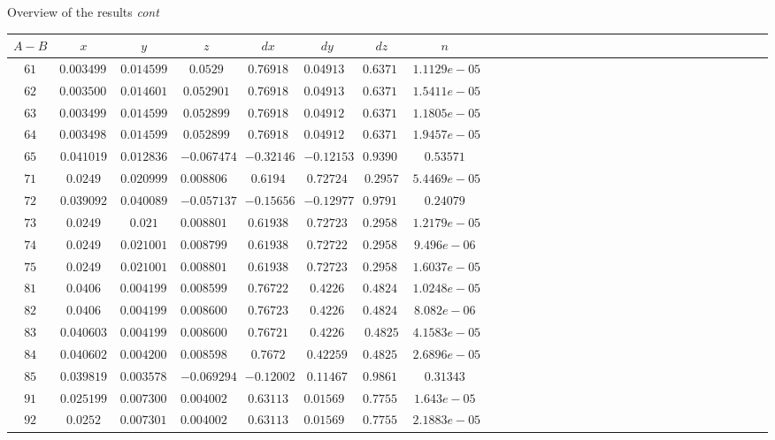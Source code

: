 \documentclass[t,12pt,english
\ifx\beamermode\undefined\else,\beamermode\fi
]{beamer}
\begin{document}
\begin{frame}{Overview of the results \textit{cont}}
 

 \begin{table}[!htbp]
\tiny 
\centering

\begin{tabular}{c c c c c c c c c c c c c c c c c c c c c c c c c c c c c c c } 
   \hline 

$A-B $&$ x$&$y$&$z$&$dx$&$dy$&$dz$&$n$\\
\hline 
$61 $&$0.0034997$&$ 0.014599$&$      0.0529$&$  0.76918 $&$0.049132 $&$0.63714$&$1.1129e-05$\\
$62 $&$0.0035007$&$ 0.014601  $&$  0.052901$&$0.76918$&$0.049132 $&$0.63714$&$1.5411e-05$\\
$63 $&$0.0034994$&$ 0.014599$&$0.052899$&$ 0.76918$&$ 0.049126$&$0.63714$&$1.1805e-05$\\
$64 $&$0.0034989$&$ 0.014599$&$ 0.052899$&$   0.76918$&$0.049128$&$0.63714$&$1.9457e-05$\\
$65 $&$0.041019$&$0.012836$&$ -0.067474$&$-0.32146$&$-0.12153$&$ 0.93909$&$0.53571$\\
$71 $&$0.0249    $&$0.020999 $&$0.0088067 $&$0.6194  $&$0.72724$&$   0.2957$&$  5.4469e-05$\\
$72 $&$0.039092$&$ 0.040089$&$-0.057137$&$ -0.15656$&$-0.12977$&$0.97911$&$0.24079$\\
$73 $&$0.0249$&$   0.021   $&$0.0088015$&$0.61938$&$0.72723$&$0.29582$&$1.2179e-05$\\
$74 $&$0.0249    $&$0.021001$&$ 0.0087997$&$0.61938$&$0.72722$&$ 0.29584$&$9.496e-06$\\
$75 $&$0.0249    $&$0.021001 $&$  0.0088015 $&$0.61938$&$0.72723$&$0.29582$&$1.6037e-05$\\
$81 $&$0.0406   $&$0.0041992$&$ 0.0085999$&$   0.76722 $&$0.4226$&$0.48248$&$1.0248e-05$\\
$82 $&$0.0406   $&$0.0041997$&$0.0086006$&$ 0.76723$&$ 0.4226$&$0.48247$&$8.082e-06$\\
$83 $&$0.040603$&$ 0.0041998$&$ 0.0086006$&$0.76721$&$   0.4226$&$   0.4825$&$4.1583e-05$\\
$84 $&$0.040602$&$0.0042008$&$0.0085988$&$   0.7672$&$  0.42259$&$  0.48251$&$2.6896e-05$\\
$85 $&$0.039819$&$0.0035788$&$-0.069294$&$ -0.12002$&$  0.11467 $&$0.98613$&$0.31343$\\
$91 $&$0.025199$&$0.0073006$&$0.0040021$&$ 0.63113$&$0.015698$&$0.77552$&$1.643e-05$\\
$92 $&$0.0252   $&$0.0073011$&$ 0.0040025$&$   0.63113$&$0.015696$&$  0.77552$&$2.1883e-05$\\

\end{tabular}
\end{table}
\end{frame}
\end{document}
